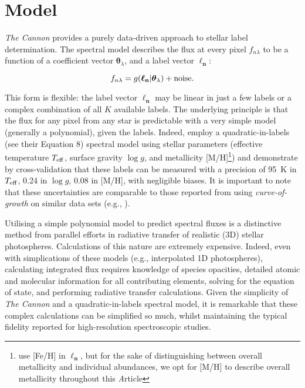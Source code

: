 \documentclass[useAMS,usenatbib]{mn2e}
\newcommand\article{\textit Article}
\newcommand\tc{\textit{The Cannon} }
\newcommand\lv{\mathbf{\boldsymbol\ell_n}}
\newcommand\cv{{\boldsymbol\theta}_\lambda}
\newcommand\given{|}
\begin{document}

\section{Model}


\tc{} provides a purely data-driven approach to stellar label determination. The
spectral model describes the flux at every pixel $f_{n\lambda}$ to be a function
of a coefficient vector $\cv$, and a label vector $\lv$:

\begin{equation}
    f_{n\lambda} = g(\lv\given\cv) + {\rm noise}.
\end{equation}

This form is flexible: the label vector $\lv$ may be linear in just a few labels
or a complex combination of all $K$ available labels. The underlying principle
is that the flux for any pixel from any star is predictable with a very simple
model (generally a polynomial), given the labels. Indeed, \citet{Ness2015}
employ a quadratic-in-labels (see their Equation 8) spectral model using stellar
parameters (effective temperature $T_{\rm eff}$, surface gravity $\log{g}$, and 
metallicity [M/H]\footnote{\citet{Ness2015} use [Fe/H] in $\lv$, but for the 
sake of distinguishing between overall metallicity and individual abundances,
we opt for [M/H] to describe overall metallicity throughout this \article{}})
and demonstrate by cross-validation that these labels can be 
measured with a precision of 95~K in $T_{\rm eff}$, 0.24 in $\log{g}$, 0.08 in 
[M/H], with negligible biases. It is important to note that these uncertainties
are comparable to those reported from using \textit{curve-of-growth} on similar 
data sets (e.g., \citet{X,Y}).  


Utilising a simple polynomial model to predict spectral fluxes is a distinctive
method from parallel efforts in radiative transfer of realistic (3D) stellar 
photospheres. Calculations of this nature are extremely expensive. Indeed, even
with simplications of these models (e.g., interpolated 1D photospheres),
calculating integrated flux requires knowledge of species opacities, detailed 
atomic and molecular information for all contributing elements, solving for
the equation of state, and performing radiative transfer calculations. Given the
simplicity of \tc{} and a quadratic-in-labels spectral model, it is remarkable
that these complex calculations can be simplified so much, whilst maintaining
the typical fidelity reported for high-resolution spectroscopic studies.
\end{document}
